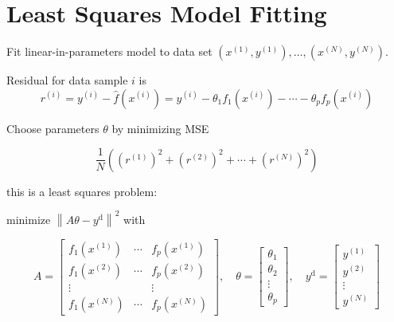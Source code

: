 \section{Least Squares Model Fitting}

\begin{problem}
    Fit linear-in-parameters model to data set $ \left(x^{(1)}, y^{(1)}\right), \ldots,\left(x^{(N)}, y^{(N)}\right) $.
\end{problem}

\begin{theorem}
    Residual for data sample $ i $ is
$$
r^{(i)}=y^{(i)}-\hat{f}\left(x^{(i)}\right)=y^{(i)}-\theta_{1} f_{1}\left(x^{(i)}\right)-\cdots-\theta_{p} f_{p}\left(x^{(i)}\right)
$$
\end{theorem}

\begin{problem}
    Choose parameters $ \theta $ by minimizing MSE

    $$
    \frac{1}{N}\left(\left(r^{(1)}\right)^{2}+\left(r^{(2)}\right)^{2}+\cdots+\left(r^{(N)}\right)^{2}\right)
    $$
\end{problem}

this is a least squares problem: 

\begin{problem}
    minimize $ \left\|A \theta-y^{\mathrm{d}}\right\|^{2} $ with

$$
A=\left[\begin{array}{ccc}
f_{1}\left(x^{(1)}\right) & \cdots & f_{p}\left(x^{(1)}\right) \\
f_{1}\left(x^{(2)}\right) & \cdots & f_{p}\left(x^{(2)}\right) \\
\vdots & & \vdots \\
f_{1}\left(x^{(N)}\right) & \cdots & f_{p}\left(x^{(N)}\right)
\end{array}\right], \quad \theta=\left[\begin{array}{c}
\theta_{1} \\
\theta_{2} \\
\vdots \\
\theta_{p}
\end{array}\right], \quad y^{\mathrm{d}}=\left[\begin{array}{c}
y^{(1)} \\
y^{(2)} \\
\vdots \\
y^{(N)}
\end{array}\right]
$$
\end{problem}



